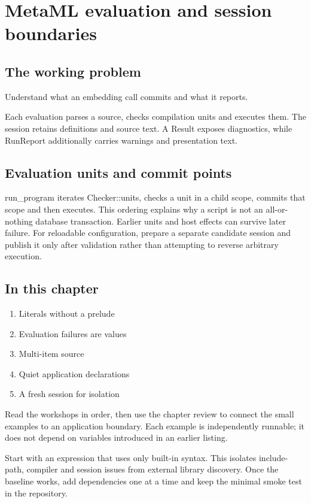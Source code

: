 \chapter{MetaML evaluation and session boundaries}\label{ch:13}
\section*{The working problem}
Understand what an embedding call commits and what it reports.

Each evaluation parses a source, checks compilation units and executes them. The session retains definitions and source text. A Result exposes diagnostics, while RunReport additionally carries warnings and presentation text.

\section*{Evaluation units and commit points}
run\_program iterates Checker::units, checks a unit in a child scope, commits that scope and then executes. This ordering explains why a script is not an all-or-nothing database transaction. Earlier units and host effects can survive later failure. For reloadable configuration, prepare a separate candidate session and publish it only after validation rather than attempting to reverse arbitrary execution.

\section*{In this chapter}
\begin{enumerate}
\item Literals without a prelude
\item Evaluation failures are values
\item Multi-item source
\item Quiet application declarations
\item A fresh session for isolation
\end{enumerate}
Read the workshops in order, then use the chapter review to connect the small examples to an application boundary. Each example is independently runnable; it does not depend on variables introduced in an earlier listing.

\clearpage
{}
Start with an expression that uses only built-in syntax. This isolates include-path, compiler and session issues from external library discovery. Once the baseline works, add dependencies one at a time and keep the minimal smoke test in the repository.

